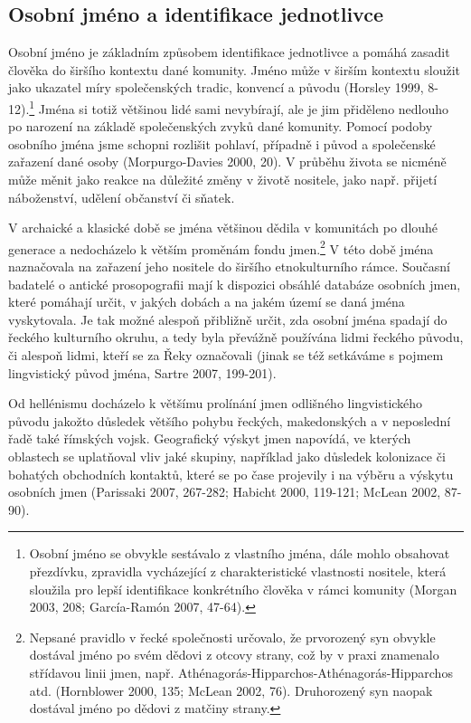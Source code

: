 \subsection[osobní-jméno-a-identifikace-jednotlivce]{Osobní jméno a identifikace jednotlivce}

Osobní jméno je základním způsobem identifikace jednotlivce a pomáhá zasadit člověka do širšího kontextu dané komunity. Jméno může v širším kontextu sloužit jako ukazatel míry společenských tradic, konvencí a původu (Horsley 1999, 8-12).\footnote{Osobní jméno se obvykle sestávalo z vlastního jména, dále mohlo obsahovat přezdívku, zpravidla vycházející z charakteristické vlastnosti nositele, která sloužila pro lepší identifikace konkrétního člověka v rámci komunity (Morgan 2003, 208; García-Ramón 2007, 47-64).} Jména si totiž většinou lidé sami nevybírají, ale je jim přiděleno nedlouho po narození na základě společenských zvyků dané komunity. Pomocí podoby osobního jména jsme schopni rozlišit pohlaví, případně i původ a společenské zařazení dané osoby (Morpurgo-Davies 2000, 20). V průběhu života se nicméně může měnit jako reakce na důležité změny v životě nositele, jako např. přijetí náboženství, udělení občanství či sňatek.

V archaické a klasické době se jména většinou dědila v komunitách po dlouhé generace a nedocházelo k větším proměnám fondu jmen.\footnote{Nepsané pravidlo v řecké společnosti určovalo, že prvorozený syn obvykle dostával jméno po svém dědovi z otcovy strany, což by v praxi znamenalo střídavou linii jmen, např. Athénagorás-Hipparchos-Athénagorás-Hipparchos atd. (Hornblower 2000, 135; McLean 2002, 76). Druhorozený syn naopak dostával jméno po dědovi z matčiny strany.} V této době jména naznačovala na zařazení jeho nositele do širšího etnokulturního rámce. Současní badatelé o antické prosopografii mají k dispozici obsáhlé databáze osobních jmen, které pomáhají určit, v jakých dobách a na jakém území se daná jména vyskytovala. Je tak možné alespoň přibližně určit, zda osobní jména spadají do řeckého kulturního okruhu, a tedy byla převážně používána lidmi řeckého původu, či alespoň lidmi, kteří se za Řeky označovali (jinak se též setkáváme s pojmem lingvistický původ jména, Sartre 2007, 199-201).

Od hellénismu docházelo k většímu prolínání jmen odlišného lingvistického původu jakožto důsledek většího pohybu řeckých, makedonských a v neposlední řadě také římských vojsk. Geografický výskyt jmen napovídá, ve kterých oblastech se uplatňoval vliv jaké skupiny, například jako důsledek kolonizace či bohatých obchodních kontaktů, které se po čase projevily i na výběru a výskytu osobních jmen (Parissaki 2007, 267-282; Habicht 2000, 119-121; McLean 2002, 87-90).

